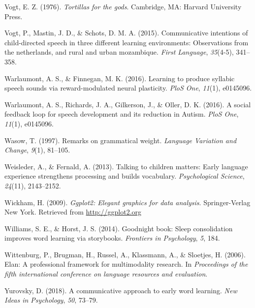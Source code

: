 \documentclass[floatsintext,man]{apa6}
\theoremstyle{definition}
\theoremstyle{definition}
\theoremstyle{definition}
\theoremstyle{remark}
\begin{document}
\hypertarget{ref-vogt1976tortillas}{}
Vogt, E. Z. (1976). \emph{Tortillas for the gods}. Cambridge, MA:
Harvard University Press.

\hypertarget{ref-vogt2015communicative}{}
Vogt, P., Mastin, J. D., \& Schots, D. M. A. (2015). Communicative
intentions of child-directed speech in three different learning
environments: Observations from the netherlands, and rural and urban
mozambique. \emph{First Language}, \emph{35}(4-5), 341--358.

\hypertarget{ref-warlaumont2016learning}{}
Warlaumont, A. S., \& Finnegan, M. K. (2016). Learning to produce
syllabic speech sounds via reward-modulated neural plasticity.
\emph{PloS One}, \emph{11}(1), e0145096.

\hypertarget{ref-warlaumont2014social}{}
Warlaumont, A. S., Richards, J. A., Gilkerson, J., \& Oller, D. K.
(2016). A social feedback loop for speech development and its reduction
in Autism. \emph{PloS One}, \emph{11}(1), e0145096.

\hypertarget{ref-wasow1997remarks}{}
Wasow, T. (1997). Remarks on grammatical weight. \emph{Language
Variation and Change}, \emph{9}(1), 81--105.

\hypertarget{ref-weisleder2013talking}{}
Weisleder, A., \& Fernald, A. (2013). Talking to children matters: Early
language experience strengthens processing and builds vocabulary.
\emph{Psychological Science}, \emph{24}(11), 2143--2152.

\hypertarget{ref-R-ggplot2}{}
Wickham, H. (2009). \emph{Ggplot2: Elegant graphics for data analysis}.
Springer-Verlag New York. Retrieved from \url{http://ggplot2.org}

\hypertarget{ref-williams2014goodnight}{}
Williams, S. E., \& Horst, J. S. (2014). Goodnight book: Sleep
consolidation improves word learning via storybooks. \emph{Frontiers in
Psychology}, \emph{5}, 184.

\hypertarget{ref-ELAN}{}
Wittenburg, P., Brugman, H., Russel, A., Klassmann, A., \& Sloetjes, H.
(2006). Elan: A professional framework for multimodality research. In
\emph{Proceedings of the fifth international conference on language
resources and evaluation}.

\hypertarget{ref-yurovsky2018communicative}{}
Yurovsky, D. (2018). A communicative approach to early word learning.
\emph{New Ideas in Psychology}, \emph{50}, 73--79.

\endgroup
\end{document}
